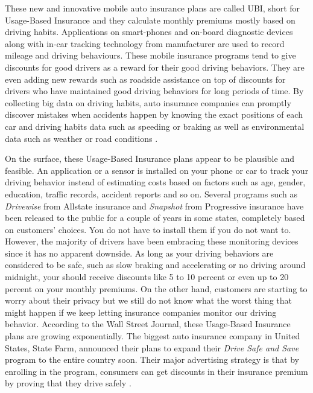 These new and innovative mobile auto insurance plans are called UBI, short for Usage-Based Insurance and they calculate monthly premiums mostly based on driving habits. Applications on smart-phones and on-board diagnostic devices along with in-car tracking technology from manufacturer are used to record mileage and driving behaviours. 
These mobile insurance programs tend to give discounts for good drivers as a reward for their good driving behaviors. They are even adding new rewards such as roadside assistance on top of discounts for drivers who have maintained good driving behaviors for long periods of time. By collecting big data on driving habits, auto insurance companies can promptly discover mistakes when accidents happen by knowing the exact positions of each car and driving habits data such as speeding or braking as well as environmental data such as weather or road conditions \cite{Shafer2016industry}.

On the surface, these Usage-Based Insurance plans appear to be plausible and feasible. An application or a sensor is installed on your phone or car to track your driving behavior instead of estimating costs based on factors such as age, gender, education, traffic records, accident reports and so on. Several programs such as {\em Drivewise} from Allstate insurance and {\em Snapshot} from Progressive insurance have been released to the public for a couple of years in some states, completely based on customers' choices. You do not have to install them if you do not want to. However, the majority of drivers have been embracing these monitoring devices since it has no apparent downside. As long as your driving behaviors are considered to be safe, such as slow braking and accelerating or no driving around midnight, your should receive discounts like 5 to 10 percent or even up to 20 percent on your monthly premiums. On the other hand, customers are starting to worry about their privacy but we still do not know what the worst thing that might happen if we keep letting insurance companies monitor our driving behavior. According to the Wall Street Journal, these Usage-Based Insurance plans are growing exponentially. The biggest auto insurance company in United States, State Farm, announced their plans to expand their {\em Drive Safe and Save} program to the entire country soon. Their major advertising strategy is that by enrolling in the program, consumers can get discounts in their insurance premium by proving that they drive safely \cite{Tuttle2013habits}.

